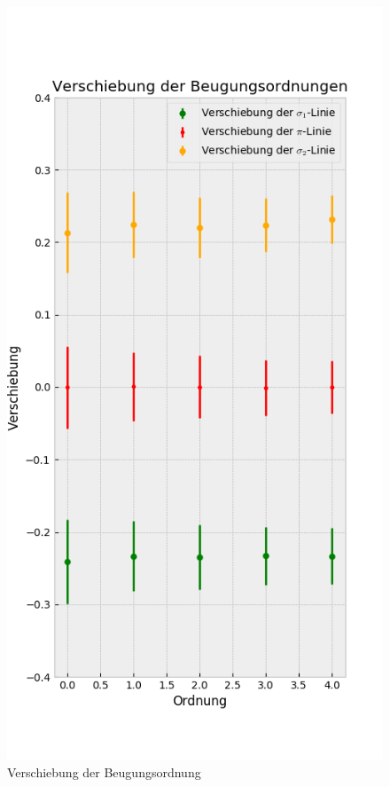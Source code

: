         \begin{landscape}
          \thispagestyle{empty}
          \begin{figure}
            \vspace*{-2cm}
            \caption{Verschiebung der Beugungsordnung}
            \hspace*{-5cm}\vspace{-1cm}
            \includegraphics[width=.45\paperwidth]{Auswertung/scatterorder/diff_sco10A}

\end{figure}
\end{landscape}

